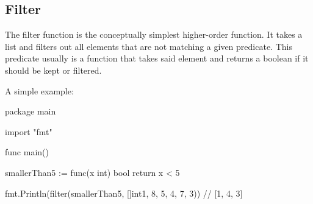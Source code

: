 \subsection{Filter}

The filter function is the conceptually simplest higher-order function.
It takes a list and filters out all elements that are not matching
a given predicate.
This predicate usually is a function that takes said element and returns
a boolean if it should be kept or filtered.

A simple example:

\begin{code}
    \label{code:filter-go}
    \begin{gocode}
package main

import "fmt"

func main() {
  smallerThan5 := func(x int) bool {
    return x < 5
  }

  fmt.Println(filter(smallerThan5, []int{1, 8, 5, 4, 7, 3})) // [1, 4, 3]
}
\end{gocode}
\end{code}
